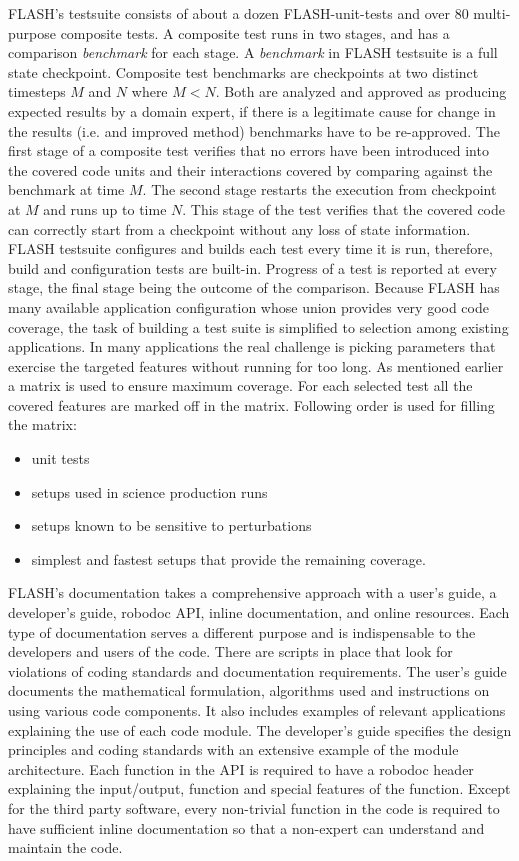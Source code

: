 FLASH's testsuite consists of about a dozen {FLASH-unit-tests} and
over $80$ multi-purpose composite tests. A composite test runs in two
stages, and has a comparison {\em benchmark} for each stage. A {\em
  benchmark} in FLASH testsuite is a full state checkpoint. Composite
test benchmarks are checkpoints at two distinct timesteps $M$ and $N$ where
$M < N$. Both are analyzed and approved as producing expected results
by a domain expert, if there is a legitimate cause for change in the
results (i.e. and improved method) benchmarks have to be
re-approved. The first stage of a composite  test verifies that no
errors have been introduced into the covered code units and their interactions
covered by comparing against the benchmark at time $M$. The second
stage restarts the execution from checkpoint at $M$ and runs up to
time $N$. This stage of the test verifies that the covered code can
correctly start from a checkpoint without any loss of state
information. FLASH testsuite configures and builds each test every
time it is run, therefore, build and configuration tests are
built-in. Progress of a test is reported at every stage, the final
stage being the outcome of the comparison. Because FLASH has many
available application configuration whose union provides  
very good code coverage, the task of building a test suite is simplified
to selection among existing applications. In many applications the
real challenge is picking parameters that exercise the targeted
features without running for too long. As mentioned earlier a matrix
is used to ensure maximum coverage. For each selected test all the
covered features are marked off in the matrix. Following order is used
for filling the matrix:
\begin{itemize}
\item unit tests
\item setups used in science production runs
\item setups known to be sensitive to perturbations
\item simplest and fastest setups that provide the remaining coverage. 
\end{itemize} 

FLASH's documentation takes a comprehensive approach with a
user's guide, a developer's guide, robodoc API, inline documentation,
and online resources. Each type of documentation serves a different
purpose and is indispensable to the developers and users of the code.  
There are scripts in place that look for violations of coding
standards and documentation requirements. The user's guide documents the
mathematical formulation, algorithms used and instructions on using
various code components. It also includes examples of
relevant applications explaining the use of each code module. The
developer's guide specifies the design principles and coding standards
with an extensive example of the module architecture. Each function in
the API is required to have a robodoc header explaining the
input/output, function and special features of the function. Except
for the third party software, every non-trivial function in the code
is required to have sufficient inline documentation so that a non-expert
can understand and maintain the code.


